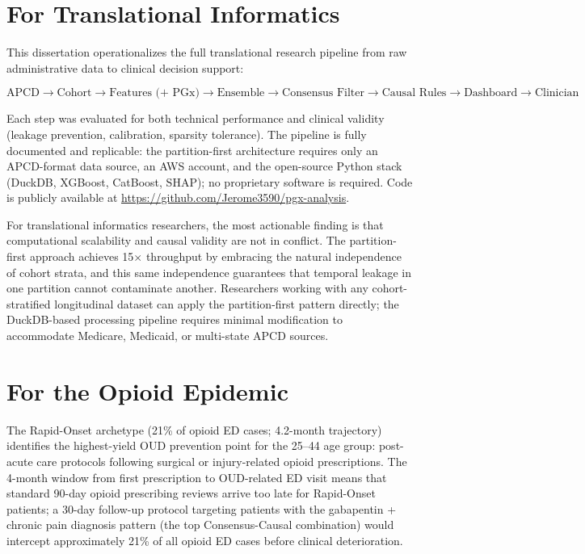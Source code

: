 \documentclass[
  12pt,
]{book}
\begin{document}
\section{For Translational
Informatics}\label{for-translational-informatics}

This dissertation operationalizes the full translational research
pipeline from raw administrative data to clinical decision support:

\[\text{APCD} \to \text{Cohort} \to \text{Features (+ PGx)}
  \to \text{Ensemble} \to \text{Consensus Filter}
  \to \text{Causal Rules} \to \text{Dashboard} \to \text{Clinician}\]

Each step was evaluated for both technical performance and clinical
validity (leakage prevention, calibration, sparsity tolerance). The
pipeline is fully documented and replicable: the partition-first
architecture requires only an APCD-format data source, an AWS account,
and the open-source Python stack (DuckDB, XGBoost, CatBoost, SHAP); no
proprietary software is required. Code is publicly available at
\url{https://github.com/Jerome3590/pgx-analysis}.

For translational informatics researchers, the most actionable finding
is that computational scalability and causal validity are not in
conflict. The partition-first approach achieves 15\(\times\) throughput
by embracing the natural independence of cohort strata, and this same
independence guarantees that temporal leakage in one partition cannot
contaminate another. Researchers working with any cohort-stratified
longitudinal dataset can apply the partition-first pattern directly; the
DuckDB-based processing pipeline requires minimal modification to
accommodate Medicare, Medicaid, or multi-state APCD sources.

\section{For the Opioid Epidemic}\label{for-the-opioid-epidemic}

The Rapid-Onset archetype (21\% of opioid ED cases; 4.2-month
trajectory) identifies the highest-yield OUD prevention point for the
25--44 age group: post-acute care protocols following surgical or
injury-related opioid prescriptions. The 4-month window from first
prescription to OUD-related ED visit means that standard 90-day opioid
prescribing reviews arrive too late for Rapid-Onset patients; a 30-day
follow-up protocol targeting patients with the gabapentin + chronic pain
diagnosis pattern (the top Consensus-Causal combination) would intercept
approximately 21\% of all opioid ED cases before clinical deterioration.
\end{document}

